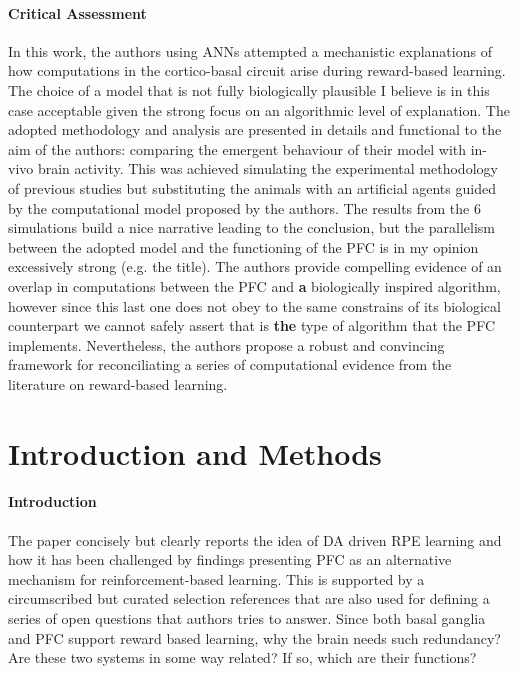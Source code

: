 \documentclass{article}
\begin{document}
\paragraph{Critical Assessment}
\label{critical_assessment}
In this work, the authors using ANNs attempted a mechanistic explanations of how computations in the cortico-basal circuit arise during reward-based learning. The choice of a model that is not fully biologically plausible I believe is in this case acceptable given the strong focus on an algorithmic level of explanation. The adopted methodology and analysis are presented in details and functional to the aim of the authors: comparing the emergent behaviour of their model with in-vivo brain activity. This was achieved simulating the experimental methodology of previous studies but substituting the animals with an artificial agents guided by the computational model proposed by the authors. The results from the 6 simulations build a nice narrative leading to the conclusion, but the parallelism between the adopted model and the functioning of the PFC is in my opinion excessively strong (e.g. the title). The authors provide compelling evidence of an overlap in computations between the PFC and \textbf{a} biologically inspired algorithm, however since this last one does not obey to the same constrains of its biological counterpart we cannot safely assert that is \textbf{the} type of algorithm that the PFC implements. Nevertheless, the authors propose a robust and convincing framework for reconciliating a series of computational evidence from the literature on reward-based learning.

\section{Introduction and Methods}
\label{intro_and_methods}

\paragraph{Introduction}
\label{intro}
The paper concisely but clearly reports the idea of DA driven RPE learning and how it has been challenged by findings presenting PFC as an alternative mechanism for reinforcement-based learning. This is supported by a circumscribed but curated selection references that are also used for defining a series of open questions that authors tries to answer. Since both basal ganglia and PFC support reward based learning, why the brain needs such redundancy? Are these two systems in some way related? If so, which are their functions?
\end{document}
